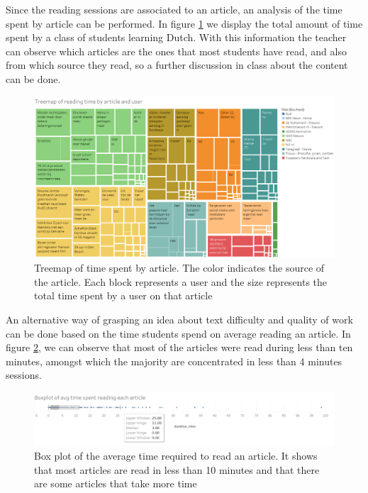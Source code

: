 Since the reading sessions are associated to an article, an analysis of the time spent by article can be performed. In figure \ref{fig:treemap_by_article} we display the total amount of time spent by a class of students learning Dutch. With this information the teacher can observe which articles are the ones that most students have read, and also from which source they read, so a further discussion in class about the content can be done.

\begin{figure}[h]
	\centering
	\includegraphics[width=1\linewidth]{gfx/Treemap_by_article}
	\caption{Treemap of time spent by article. The color indicates the source of the article. Each block represents a user and the size represents the total time spent by a user on that article}
	\label{fig:treemap_by_article}
\end{figure}

An alternative way of grasping an idea about text difficulty and quality of work can be done based on the time students spend on average reading an article. In figure \ref{fig:boxplot_by_article}, we can observe that most of the articles were read during less than ten minutes, amongst which the majority are concentrated in less than 4 minutes sessions.

\begin{figure}[h]
	\centering
	\includegraphics[width=0.7\linewidth]{gfx/avg_time_spent_by_article}
	\caption{Box plot of the average time required to read an article. It shows that most articles are read in less than 10 minutes and that there are some articles that take more time}
	\label{fig:boxplot_by_article}
\end{figure}

